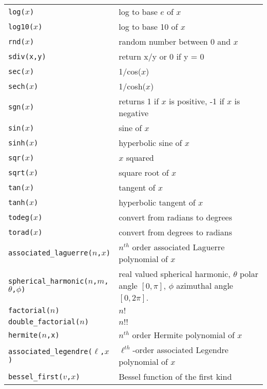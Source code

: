 \begin{supertabular}{ll}
{\tt log($x$)}          	& log to base $e$ of $x$ \\
{\tt log10($x$)}      	& log to base 10 of $x$ \\
{\tt rnd($x$)}          	& random number between 0 and $x$ \\
{\tt sdiv(x,y)} 	     	& return x/y or 0 if y = 0 \\
{\tt sec($x$)} 	     	& 1/cos($x$) \\
{\tt sech($x$)}        	& 1/cosh($x$) \\
{\tt sgn($x$)}          	& returns 1 if $x$ is positive, -1 if $x$ is negative \\
{\tt sin($x$)}          	& sine of $x$ \\
{\tt sinh($x$)}        	& hyperbolic sine of $x$ \\
{\tt sqr($x$)}          	& $x$ squared  \\
{\tt sqrt($x$)}        	& square root of $x$ \\
{\tt tan($x$)}          	& tangent of $x$ \\	
{\tt tanh($x$)}        	& hyperbolic tangent of $x$ \\
{\tt todeg($x$)}      	& convert from radians to degrees \\
{\tt torad($x$)}      	& convert from degrees to radians \\
{\tt associated\_laguerre($n$,$x$)}    & $n^{th}$ order associated Laguerre polynomial of $x$   \\
{\tt spherical\_harmonic($n$,$m$,$\theta$,$\phi$)}        & real valued spherical harmonic, $\theta$ polar angle $[0,\pi]$, $\phi$ azimuthal angle $[0,2\pi]$. \\
{\tt factorial($n$)}      	           & $n!$ \\
{\tt double\_factorial($n$)}       & $n!!$  \\
{\tt hermite($n$,x)}      	               & $n^{th}$ order Hermite polynomial of $x$ \\
{\tt associated\_legendre($\ell$,$x$)}      & $\ell^{th}$-order associated Legendre polynomial of $x$ \\
{\tt bessel\_first($v$,$x$)}      	   & Bessel function of the first kind \\

\end{supertabular}
